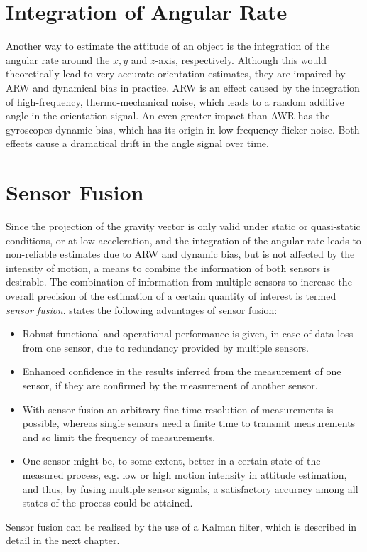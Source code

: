 \section{Integration of Angular Rate}

Another way to estimate the attitude of an object is the integration of the angular rate around the $x, y$ and $z$-axis, respectively. Although this would theoretically lead to very accurate orientation estimates, they are impaired by \gls{ARW} and dynamical bias in practice. \gls{ARW} is an effect caused by the integration of high-frequency, thermo-mechanical noise, which leads to a random additive angle in the orientation signal. An even greater impact than AWR has the gyroscopes dynamic bias, which has its origin in low-frequency flicker noise. Both effects cause a dramatical drift in the angle signal over time.

\section{Sensor Fusion}

Since the projection of the gravity vector is only valid under static or quasi-static conditions, or at low acceleration, and the integration of the angular rate leads to non-reliable estimates due to \gls{ARW} and dynamic bias, but is not affected by the intensity of motion, a means to combine the information of both sensors is desirable. The combination of information from multiple sensors to increase the overall precision of the estimation of a certain quantity of interest is termed \emph{sensor fusion}. \citeauthor{raol2009multi} \cite{raol2009multi} states the following advantages of sensor fusion:
 
\begin{itemize}
\item Robust functional and operational performance is given, in case of data loss from one sensor, due to redundancy provided by multiple sensors.
\item Enhanced confidence in the results inferred from the measurement of one sensor, if they are confirmed by the measurement of another sensor.
\item With sensor fusion an arbitrary fine time resolution of measurements is possible, whereas single sensors need a finite time to transmit measurements and so limit the frequency of measurements.
\item One sensor might be, to some extent, better in a certain state of the measured process, e.g. low or high motion intensity in attitude estimation, and thus, by fusing multiple sensor signals, a satisfactory accuracy among all states of the process could be attained.
\end{itemize}

\noindent
Sensor fusion can be realised by the use of a Kalman filter, which is described in detail in the next chapter.


